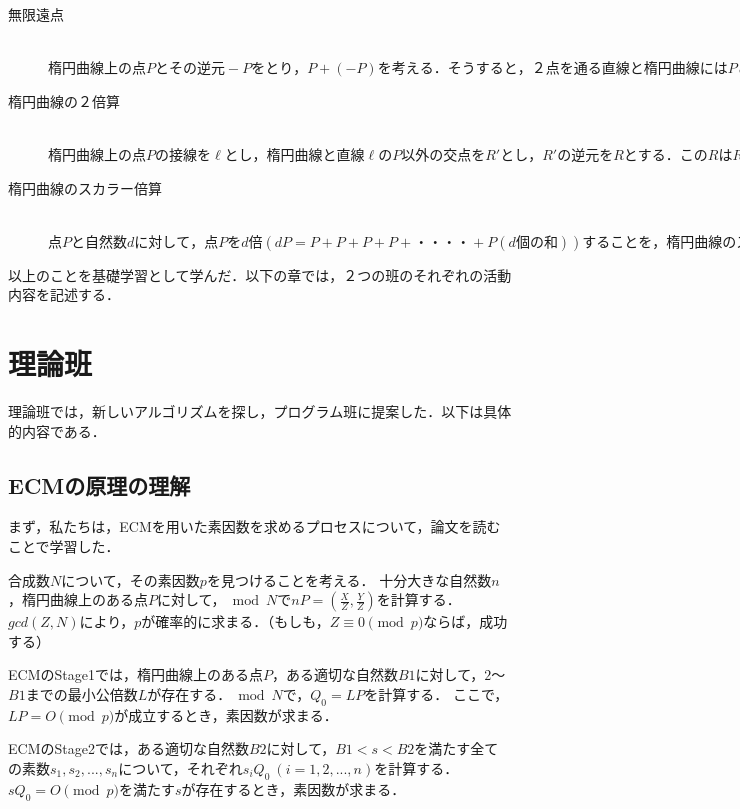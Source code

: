 \documentclass[openany,11pt,papersize]{jsbook}
\begin{document}
\begin{description}
\item[無限遠点]\mbox{}\\
$楕円曲線上の点Pとその逆元-Pをとり，P+(-P)を考える．そうすると，２点を通る直線と楕円曲線にはPと-Pの他には交点が存在しない．このような状態のときに，存在しない点を仮想的に考え，それを無限遠点と呼び，P+(-P)= Oが成り立つ．$

\item[楕円曲線の２倍算]\mbox{}\\
$楕円曲線上の点Pの接線を \ell とし，楕円曲線と直線 \ell のP以外の交点をR'とし，R'の逆元をRとする．このRはR=P+P=2Pであり．楕円曲線の2倍算と定義する．$
	
\item[楕円曲線のスカラー倍算]\mbox{}\\
$点Pと自然数dに対して，点Pをd倍(dP=P+P+P+P+・・・・+P(d個の和))することを，楕円曲線のスカラー倍算という．$

\end{description}
以上のことを基礎学習として学んだ．以下の章では，２つの班のそれぞれの活動内容を記述する．


\section{理論班}
理論班では，新しいアルゴリズムを探し，プログラム班に提案した．以下は具体的内容である．

\subsection{ECMの原理の理解}
まず，私たちは，ECMを用いた素因数を求めるプロセスについて，論文を読むことで学習した．

合成数$N$について，その素因数$p$を見つけることを考える．
十分大きな自然数$n$，楕円曲線上のある点$P$に対して，$ \bmod{N} $で$ nP=(\frac{X}{Z},\frac{Y}{Z}) $を計算する．$gcd(Z,N)$により，$p$が確率的に求まる．（もしも，$Z \equiv 0 \pmod{p}$ならば，成功する）


ECMのStage1では，楕円曲線上のある点$P$，ある適切な自然数$B1$に対して，$2$～$B1$までの最小公倍数$L$が存在する．$\bmod{N}$で，$Q_{0}=LP$を計算する．
ここで，$LP = O\pmod{p}$が成立するとき，素因数が求まる．


ECMのStage2では，ある適切な自然数$B2$に対して，$B1<s<B2$を満たす全ての素数$s_{1},s_{2},...,s_{n}$について，それぞれ$s_{i}Q_{0} \ (i=1,2,...,n)$を計算する．
$sQ_{0} = O \pmod{p} $を満たす$s$が存在するとき，素因数が求まる．
\end{document}
